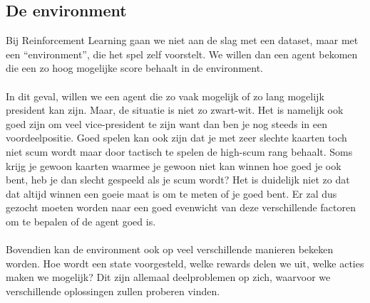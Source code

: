 \documentclass[11pt]{article}
\begin{document}
\subsection{De environment}
Bij Reinforcement Learning gaan we niet aan de slag met een dataset, maar met een “environment”, die het spel zelf voorstelt. We willen dan een agent bekomen die een zo hoog mogelijke score behaalt in de environment. \\\\
In dit geval, willen we een agent die zo vaak mogelijk of zo lang mogelijk president kan zijn. Maar, de situatie is niet zo zwart-wit. Het is namelijk ook goed zijn om veel vice-president te zijn want dan ben je nog steeds in een voordeelpositie. Goed spelen kan ook zijn dat je met zeer slechte kaarten toch niet scum wordt maar door tactisch te spelen de high-scum rang behaalt. Soms krijg je gewoon kaarten waarmee je gewoon niet kan winnen hoe goed je ook bent, heb je dan slecht gespeeld als je scum wordt? Het is duidelijk niet zo dat dat altijd winnen een goeie maat is om te meten of je goed bent. Er zal dus gezocht moeten worden naar een goed evenwicht van deze verschillende factoren om te bepalen of de agent goed is. \\\\
Bovendien kan de environment ook op veel verschillende manieren bekeken worden. Hoe wordt een state voorgesteld, welke rewards delen we uit, welke acties maken we mogelijk? Dit zijn allemaal deelproblemen op zich, waarvoor we verschillende oplossingen zullen proberen vinden.\\
\end{document}
